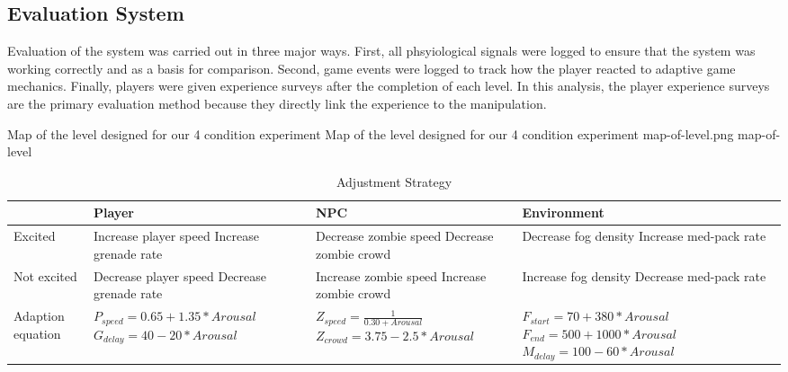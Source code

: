 \documentclass[conference]{IEEEtran}
\begin{document}
\subsection{Evaluation System}
Evaluation of the system was carried out in three major ways. First, all phsyiological signals were logged to ensure that the system was working correctly and as a basis for comparison. Second, game events were logged to track how the player reacted to adaptive game mechanics. Finally, players were given experience surveys after the completion of each level. In this analysis, the player experience surveys are the primary evaluation method because they directly link the experience to the manipulation.

\img
{Map of the level designed for our 4 condition experiment}
{Map of the level designed for our 4 condition experiment}
{map-of-level.png}
{map-of-level}

\begin{table*}[!t]
\caption{Adjustment Strategy}
\label{tbl:adjustment-strategy}
\hfil
\centering
\begin{tabular}{lp{4cm}p{4cm}p{4cm}}
                     & Player                            & NPC                             & Environment \\
\hline
Excited              & Increase player speed \newline Increase grenade rate
                     & Decrease zombie speed \newline Decrease zombie crowd
                     & Decrease fog density \newline Increase med-pack rate  \\
\hline
Not excited          & Decrease player speed \newline Decrease grenade rate
                     & Increase zombie speed \newline Increase zombie crowd
                     & Increase fog density \newline Decrease med-pack rate  \\
\hline
Adaption \newline
equation             & $P_{speed} = 0.65 + 1.35 * Arousal$    \newline $G_{delay} = 40 - 20 * Arousal$
                     & $Z_{speed} = \frac{1}{0.30 + Arousal}$ \newline $Z_{crowd} = 3.75 - 2.5 * Arousal$
                     & $F_{start} = 70 + 380 * Arousal$       \newline $F_{end} = 500 + 1000 * Arousal$ \newline $M_{delay} = 100 - 60 * Arousal$ \\
\end{tabular}
\end{table*}
\end{document}
